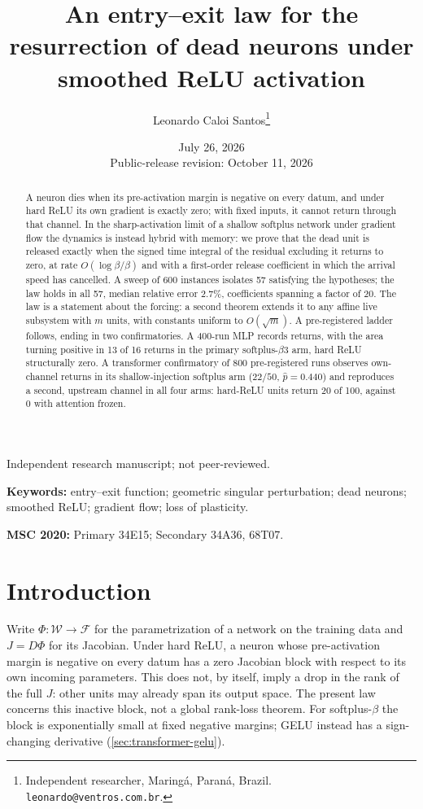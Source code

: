 \documentclass[11pt]{article}
\title{An entry--exit law for the resurrection of dead neurons
under smoothed ReLU activation}
\author{Leonardo Caloi Santos\thanks{Independent researcher, Maring\'a,
Paran\'a, Brazil. \texttt{leonardo@ventros.com.br}.}}
\date{July 26, 2026\\Public-release revision: October 11, 2026}
\theoremstyle{definition}
\theoremstyle{remark}
\begin{document}
\maketitle
\begin{center}\small Independent research manuscript; not peer-reviewed.\end{center}

\begin{abstract}
A neuron dies when its pre-activation margin is negative on every datum, and
under hard ReLU its own gradient is exactly zero; with fixed inputs, it
cannot return through that channel. In the
sharp-activation limit of a shallow softplus network under gradient flow the
dynamics is instead hybrid with memory: we prove that the dead unit is
released exactly when the signed time integral of the residual excluding it
returns to zero, at rate $O(\log\beta/\beta)$ and with a first-order release
coefficient in which the arrival speed has cancelled. A sweep of 600
instances isolates 57 satisfying the hypotheses; the law holds in all 57,
median relative error $2.7\%$, coefficients spanning a factor of 20.
The law is a statement about the forcing: a second theorem extends it to any
affine live subsystem with $m$ units, with constants uniform to $O(\sqrt m)$. A
pre-registered ladder follows, ending in two confirmatories. A 400-run MLP
records returns, with the area turning positive in 13 of 16 returns
in the primary softplus-$\beta3$ arm,
hard ReLU structurally zero. A transformer confirmatory of 800 pre-registered
runs observes own-channel returns in its shallow-injection softplus arm
($22/50$, $\hat p=0.440$) and reproduces a second, upstream channel in all four
arms: hard-ReLU units return 20 of 100, against 0 with attention frozen.
\end{abstract}

\noindent\textbf{Keywords:} entry--exit function; geometric singular
perturbation; dead neurons; smoothed ReLU; gradient flow; loss of plasticity.

\smallskip
\noindent\textbf{MSC 2020:} Primary 34E15; Secondary 34A36, 68T07.

\section{Introduction}\label{sec:intro}

Write $\Phi:\mathcal{W}\to\mathcal{F}$ for the parametrization of a network
on the training data and $J=D\Phi$ for its Jacobian. Under hard ReLU, a neuron
whose pre-activation margin is negative on every datum has a zero Jacobian
block with respect to its own incoming parameters. This does not, by itself,
imply a drop in the rank of the full $J$: other units may already span its
output space. The present law concerns this inactive block, not a global
rank-loss theorem. For softplus-$\beta$ the block is exponentially small at
fixed negative margins; GELU instead has a sign-changing derivative
(\cref{sec:transformer-gelu}).
\end{document}
